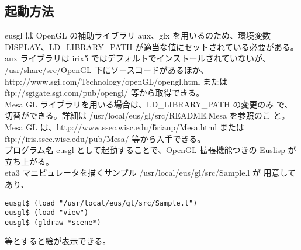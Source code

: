 \subsection{起動方法}
eusgl は OpenGL の補助ライブラリ aux、glx を用いるのため、環境変数 
DISPLAY、LD\_LIBRARY\_PATH が適当な値にセットされている必要がある。aux 
ライブラリは irix5 ではデフォルトでインストールされていないが、
/usr/share/src/OpenGL 下にソースコードがあるほか、
http://www.sgi.com/Technology/openGL/opengl.html または 
ftp://sgigate.sgi.com/pub/opengl/ 等から取得できる。\\

Mesa GL ライブラリを用いる場合は、LD\_LIBRARY\_PATH の変更のみ
で、切替ができる。詳細は /usr/local/eus/gl/src/README.Mesa を参照のこ
と。Mesa GL は、http://www.ssec.wisc.edu/\~brianp/Mesa.html または 
ftp://iris.ssec.wisc.edu/pub/Mesa/ 等から入手できる。\\

プログラム名 eusgl として起動することで、OpenGL 拡張機能つきの Euslisp
が立ち上がる。\\

eta3 マニピュレータを描くサンプル /usr/local/eus/gl/src/Sample.l が
用意してあり、

\begin{verbatim}
eusgl$ (load "/usr/local/eus/gl/src/Sample.l")
eusgl$ (load "view")
eusgl$ (gldraw *scene*)
\end{verbatim}

等とすると絵が表示できる。

